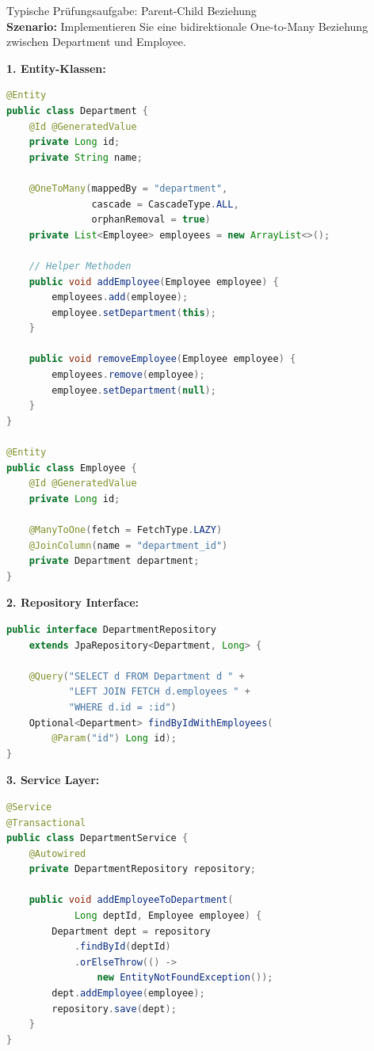\begin{example2}{Typische Prüfungsaufgabe: Parent-Child Beziehung}\\
\textbf{Szenario:}
Implementieren Sie eine bidirektionale One-to-Many Beziehung zwischen Department und Employee.

\textbf{1. Entity-Klassen:}
\begin{lstlisting}[language=Java, style=basesmol]
@Entity
public class Department {
    @Id @GeneratedValue
    private Long id;
    private String name;
    
    @OneToMany(mappedBy = "department", 
               cascade = CascadeType.ALL,
               orphanRemoval = true)
    private List<Employee> employees = new ArrayList<>();
    
    // Helper Methoden
    public void addEmployee(Employee employee) {
        employees.add(employee);
        employee.setDepartment(this);
    }
    
    public void removeEmployee(Employee employee) {
        employees.remove(employee);
        employee.setDepartment(null);
    }
}

@Entity
public class Employee {
    @Id @GeneratedValue
    private Long id;
    
    @ManyToOne(fetch = FetchType.LAZY)
    @JoinColumn(name = "department_id")
    private Department department;
}
\end{lstlisting}

\textbf{2. Repository Interface:}
\begin{lstlisting}[language=Java, style=basesmol]
public interface DepartmentRepository 
    extends JpaRepository<Department, Long> {
    
    @Query("SELECT d FROM Department d " +
           "LEFT JOIN FETCH d.employees " +
           "WHERE d.id = :id")
    Optional<Department> findByIdWithEmployees(
        @Param("id") Long id);
}
\end{lstlisting}

\textbf{3. Service Layer:}
\begin{lstlisting}[language=Java, style=basesmol]
@Service
@Transactional
public class DepartmentService {
    @Autowired
    private DepartmentRepository repository;
    
    public void addEmployeeToDepartment(
            Long deptId, Employee employee) {
        Department dept = repository
            .findById(deptId)
            .orElseThrow(() -> 
                new EntityNotFoundException());
        dept.addEmployee(employee);
        repository.save(dept);
    }
}
\end{lstlisting}
\end{example2}



